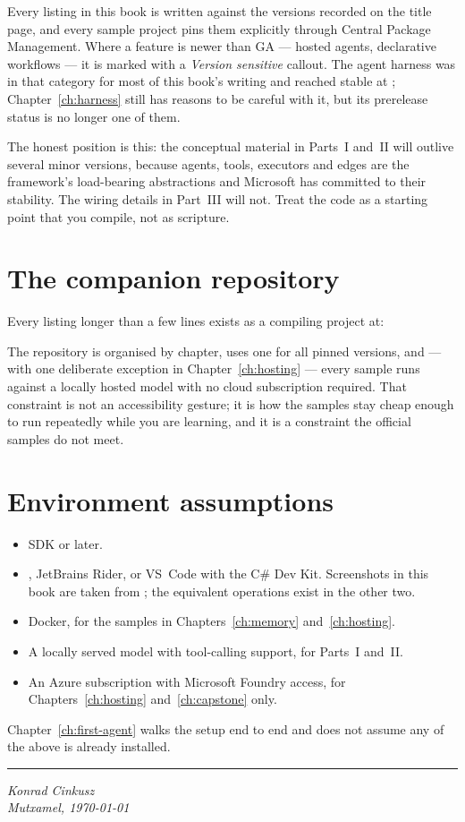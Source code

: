 Every listing in this book is written against the versions recorded on the title
page, and every sample project pins them explicitly through Central Package
Management. Where a feature is newer than GA --- hosted agents, declarative
workflows --- it is marked with a \emph{Version sensitive} callout. The agent
harness was in that category for most of this book's writing and reached stable
at ; Chapter~\ref{ch:harness} still has reasons to be careful with
it, but its prerelease status is no longer one of them.

The honest position is this: the conceptual material in Parts~I and~II will
outlive several minor versions, because agents, tools, executors and edges are
the framework's load-bearing abstractions and Microsoft has committed to their
stability. The wiring details in Part~III will not. Treat the code as a starting
point that you compile, not as scripture.

\section*{The companion repository}

Every listing longer than a few lines exists as a compiling project at:

\begin{center}
\end{center}

The repository is organised by chapter, uses one 
for all pinned versions, and --- with one deliberate exception in
Chapter~\ref{ch:hosting} --- every sample runs against a locally hosted model
with no cloud subscription required. That constraint is not an accessibility
gesture; it is how the samples stay cheap enough to run repeatedly while you are
learning, and it is a constraint the official samples do not meet.

\section*{Environment assumptions}

\begin{itemize}[leftmargin=1.4em]
  \item \dotnetver{} SDK or later.
  \item \vsver{}, JetBrains Rider, or VS~Code with the C\# Dev Kit. Screenshots
        in this book are taken from \vsver{}; the equivalent operations exist in
        the other two.
  \item Docker, for the samples in Chapters~\ref{ch:memory} and~\ref{ch:hosting}.
  \item A locally served model with tool-calling support, for Parts~I and~II.
  \item An Azure subscription with Microsoft Foundry access, for
        Chapters~\ref{ch:hosting} and~\ref{ch:capstone} only.
\end{itemize}

Chapter~\ref{ch:first-agent} walks the setup end to end and does not assume any
of the above is already installed.

\vspace{1.5em}
\noindent\rule{\linewidth}{0.4pt}
\vspace{0.5em}

\noindent\emph{Konrad Cinkusz\\ Mutxamel, \today}

\cleardoublepage

